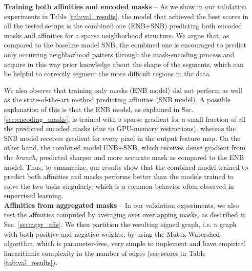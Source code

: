 \textbf{Training both affinities and encoded masks} -- As we show in our validation experiments in Table \ref{tab:val_results}, the model that achieved the best scores in all the tested setups is the combined one (ENB+SNB) predicting both encoded \maskname masks and affinities for a sparse neighborhood structure. 
We argue that, as compared to the baseline model SNB, the combined one  is encouraged to predict only occurring neighborhood patters through the mask-encoding process and acquire in this way prior knowledge about the shape of the segments, which can be helpful to correctly segment the more difficult regions in the data. 

We also observe that training only \maskname masks (ENB model) did not perform as well as the state-of-the-art method predicting affinities (SNB model). A possible explanation of this is that the ENB model, as explained in Sec. \ref{sec:encoding_masks}, is trained with a sparse gradient for a small fraction of all the predicted encoded masks (due to GPU-memory restrictions), whereas the SNB model receives gradient for every pixel in the output feature map. 
On the other hand, the combined model ENB+SNB, which receives dense gradient from the \emph{\sparseBr branch}, predicted sharper and more accurate \maskname mask as compared to the ENB model. Thus, to summarize, our results show that the combined model trained to predict both affinities and \maskname masks performs better than the models trained to solve the two tasks singularly, which is a common behavior often observed in supervised learning. \\

\textbf{Affinities from aggregated masks}  -- 
In our validation experiments, we also test the affinities computed by averaging over overlapping masks, as described in Sec. \ref{sec:aggr_affs}. We then partition the resulting signed graph, i.e. a graph with both positive and negative weights, by using the Mutex Watershed algorithm, which is parameter-free, very simple to implement and have empirical linearithmic complexity in the number of edges (see scores in Table \ref{tab:val_results}). 

